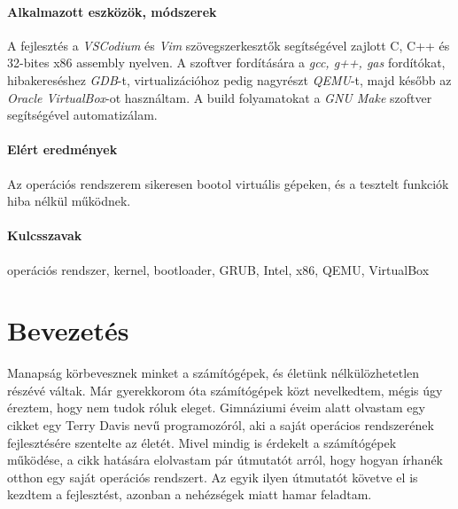 \documentclass[12pt,numbers=noenddot]{report}
\begin{document}
\subsubsection*{Alkalmazott eszközök, módszerek}

A fejlesztés a \textit{VSCodium} és \textit{Vim} szövegszerkesztők segítségével
zajlott C, C++ és 32-bites x86 assembly nyelven.
A szoftver fordítására a \textit{gcc, g++, gas} fordítókat, hibakereséshez
\textit{GDB}-t, virtualizációhoz pedig nagyrészt \textit{QEMU}-t, majd később az
\textit{Oracle VirtualBox}-ot használtam. A build folyamatokat a
\textit{GNU Make} szoftver segítségével automatizálam.

\subsubsection*{Elért eredmények}

Az operációs rendszerem sikeresen bootol virtuális gépeken, és a tesztelt
funkciók hiba nélkül működnek.

\subsubsection*{Kulcsszavak}

operációs rendszer, kernel, bootloader, GRUB, Intel, x86, QEMU, VirtualBox


\renewcommand{\contentsname}{Tartalomjegyzék}
\tableofcontents


\chapter{Bevezetés}
\pagestyle{fancy}

Manapság körbevesznek minket a számítógépek, és életünk nélkülözhetetlen részévé
váltak. Már gyerekkorom óta számítógépek közt nevelkedtem, mégis úgy éreztem,
hogy nem tudok róluk eleget. Gimnáziumi éveim alatt olvastam egy cikket egy
Terry Davis nevű programozóról, aki a saját operácios rendszerének
fejlesztésére szentelte az életét. Mivel mindig is érdekelt a számítógépek
működése, a cikk hatására elolvastam pár útmutatót arról, hogy hogyan írhanék
otthon egy saját operációs rendszert. Az egyik ilyen útmutatót követve el is
kezdtem a fejlesztést, azonban a nehézségek miatt hamar feladtam.
\end{document}
